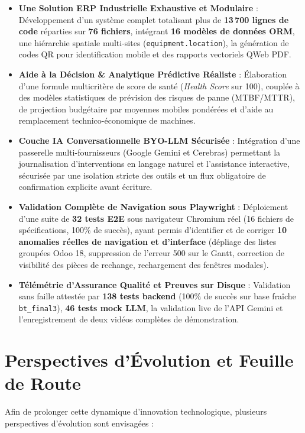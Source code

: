 \begin{itemize}[leftmargin=1.5cm, label=\textcolor{odooPurple}{\small\textbullet}]
    \item \textbf{Une Solution ERP Industrielle Exhaustive et Modulaire} : Développement d'un système complet totalisant plus de \textbf{13\,700 lignes de code} réparties sur \textbf{76 fichiers}, intégrant \textbf{16 modèles de données ORM}, une hiérarchie spatiale multi-sites (\texttt{equipment.location}), la génération de codes QR pour identification mobile et des rapports vectoriels QWeb PDF.
    \item \textbf{Aide à la Décision \& Analytique Prédictive Réaliste} : Élaboration d'une formule multicritère de score de santé (\textit{Health Score} sur 100), couplée à des modèles statistiques de prévision des risques de panne (MTBF/MTTR), de projection budgétaire par moyennes mobiles pondérées et d'aide au remplacement technico-économique de machines.
    \item \textbf{Couche IA Conversationnelle BYO-LLM Sécurisée} : Intégration d'une passerelle multi-fournisseurs (Google Gemini et Cerebras) permettant la journalisation d'interventions en langage naturel et l'assistance interactive, sécurisée par une isolation stricte des outils et un flux obligatoire de confirmation explicite avant écriture.
    \item \textbf{Validation Complète de Navigation sous Playwright} : Déploiement d'une suite de \textbf{32 tests E2E} sous navigateur Chromium réel (16 fichiers de spécifications, 100\% de succès), ayant permis d'identifier et de corriger \textbf{10 anomalies réelles de navigation et d'interface} (dépliage des listes groupées Odoo 18, suppression de l'erreur 500 sur le Gantt, correction de visibilité des pièces de rechange, rechargement des fenêtres modales).
    \item \textbf{Télémétrie d'Assurance Qualité et Preuves sur Disque} : Validation sans faille attestée par \textbf{138 tests backend} (100\% de succès sur base fraîche \texttt{bt\_final3}), \textbf{46 tests mock LLM}, la validation live de l'API Gemini et l'enregistrement de deux vidéos complètes de démonstration.
\end{itemize}

\section*{Perspectives d'Évolution et Feuille de Route}
Afin de prolonger cette dynamique d'innovation technologique, plusieurs perspectives d'évolution sont envisagées :


